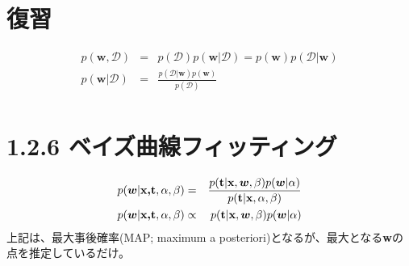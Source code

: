 \documentclass{jsarticle}
\begin{document}
\section{復習}

\begin{eqnarray}
  p(\bm{w}, \mathcal{D})  & = & p(\mathcal{D})p(\bm{w}|\mathcal{D}) = p(\bm{w})p(\mathcal{D}|\bm{w}) \\
  p(\bm{w}|\mathcal{D}) & = & \frac{p(\mathcal{D}|\bm{w})p(\bm{w})}{p(\mathcal{D})} \\
\end{eqnarray}

\section{1.2.6 ベイズ曲線フィッティング}

\begin{eqnarray}
p(\bm{w}|\mbox{\bf x,t}, \alpha,\beta) & = & \frac{p(\mbox{\bf t} | \mbox{\bf x},\bm{w},\beta) p(\bm{w}|\alpha)}{p(\mbox{\bf t}|\mbox{\bf x}, \alpha, \beta)} \\
  p(\bm{w}|\mbox{\bf x,t}, \alpha,\beta) & \propto & p(\mbox{\bf t} | \mbox{\bf x},\bm{w},\beta) p(\bm{w}|\alpha) 
\end{eqnarray}
上記は、最大事後確率(MAP; maximum a posteriori)となるが、最大となる{\bf w}の点を推定しているだけ。
\end{document}
